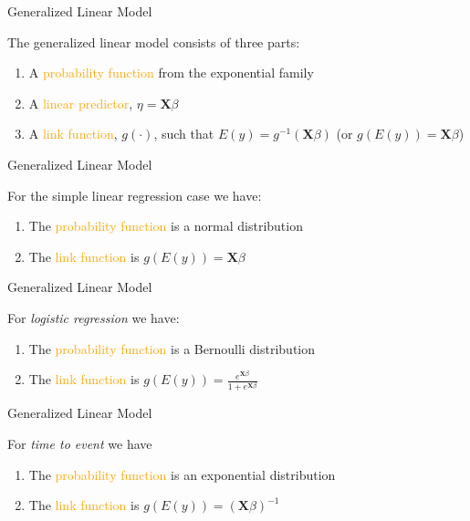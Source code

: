 \documentclass[10pt,ignorenonframetext,]{beamer}
\providecommand{\tightlist}{%
\setlength{\itemsep}{0pt}\setlength{\parskip}{0pt}}
\begin{document}
\begin{frame}{Generalized Linear Model}

The generalized linear model consists of three parts:

\begin{enumerate}[<+->]
\def\labelenumi{\arabic{enumi}.}
\tightlist
\item
  A \textcolor{orange}{probability function} from the exponential family
\item
  A \textcolor{orange}{linear predictor}, \(\eta = \boldsymbol{X}\beta\)
\item
  A \textcolor{orange}{link function}, \(g(\cdot)\), such that
  \(E(y)=g^{-1}(\boldsymbol{X}\beta)\) (or
  \(g(E(y))=\boldsymbol{X}\beta\))
\end{enumerate}

\end{frame}

\begin{frame}{Generalized Linear Model}

For the simple linear regression case we have:

\begin{enumerate}[<+->]
\def\labelenumi{\arabic{enumi}.}
\tightlist
\item
  The \textcolor{orange}{probability function} is a normal distribution
\item
  The \textcolor{orange}{link function} is
  \(g(E(y))= \boldsymbol{X}\beta\)
\end{enumerate}

\end{frame}

\begin{frame}{Generalized Linear Model}

For \emph{logistic regression} we have:

\begin{enumerate}[<+->]
\def\labelenumi{\arabic{enumi}.}
\tightlist
\item
  The \textcolor{orange}{probability function} is a Bernoulli
  distribution
\item
  The \textcolor{orange}{link function} is
  \(g(E(y))=\frac{e^{\boldsymbol{X}\beta}}{1+e^{\boldsymbol{X}\beta}}\)
\end{enumerate}

\end{frame}

\begin{frame}{Generalized Linear Model}

For \emph{time to event} we have

\begin{enumerate}[<+->]
\def\labelenumi{\arabic{enumi}.}
\tightlist
\item
  The \textcolor{orange}{probability function} is an exponential
  distribution
\item
  The \textcolor{orange}{link function} is
  \(g(E(y))={(\boldsymbol{X}\beta)}^{-1}\)
\end{enumerate}

\end{frame}
\end{document}
